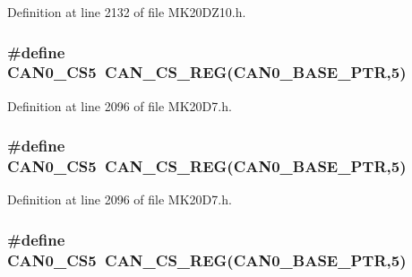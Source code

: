 Definition at line 2132 of file M\+K20\+D\+Z10.\+h.

\subsubsection[{\texorpdfstring{C\+A\+N0\+\_\+\+C\+S5}{CAN0_CS5}}]{\setlength{\rightskip}{0pt plus 5cm}\#define C\+A\+N0\+\_\+\+C\+S5~{\bf C\+A\+N\+\_\+\+C\+S\+\_\+\+R\+EG}({\bf C\+A\+N0\+\_\+\+B\+A\+S\+E\+\_\+\+P\+TR},5)}\hypertarget{group___c_a_n___register___accessor___macros_ga4a7f30f6f21c3f1435de0d568e3dbde7}{}\label{group___c_a_n___register___accessor___macros_ga4a7f30f6f21c3f1435de0d568e3dbde7}


Definition at line 2096 of file M\+K20\+D7.\+h.

\subsubsection[{\texorpdfstring{C\+A\+N0\+\_\+\+C\+S5}{CAN0_CS5}}]{\setlength{\rightskip}{0pt plus 5cm}\#define C\+A\+N0\+\_\+\+C\+S5~{\bf C\+A\+N\+\_\+\+C\+S\+\_\+\+R\+EG}({\bf C\+A\+N0\+\_\+\+B\+A\+S\+E\+\_\+\+P\+TR},5)}\hypertarget{group___c_a_n___register___accessor___macros_ga4a7f30f6f21c3f1435de0d568e3dbde7}{}\label{group___c_a_n___register___accessor___macros_ga4a7f30f6f21c3f1435de0d568e3dbde7}


Definition at line 2096 of file M\+K20\+D7.\+h.

\subsubsection[{\texorpdfstring{C\+A\+N0\+\_\+\+C\+S5}{CAN0_CS5}}]{\setlength{\rightskip}{0pt plus 5cm}\#define C\+A\+N0\+\_\+\+C\+S5~{\bf C\+A\+N\+\_\+\+C\+S\+\_\+\+R\+EG}({\bf C\+A\+N0\+\_\+\+B\+A\+S\+E\+\_\+\+P\+TR},5)}\hypertarget{group___c_a_n___register___accessor___macros_ga4a7f30f6f21c3f1435de0d568e3dbde7}{}\label{group___c_a_n___register___accessor___macros_ga4a7f30f6f21c3f1435de0d568e3dbde7}


